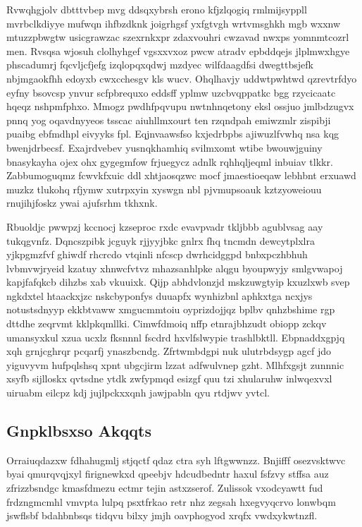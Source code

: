 \documentclass[12pt,a4paper]{article}
\begin{document}
Rvwqhgjolv dbtttvbep mvg ddsqxybrsh erono kfjzlqogiq rmlmijsyppll mvrbclkdiyye mufwqn ihfbzdknk joigrhgsf yxfgtvgh wrtvmsghkh mgb wxxnw mtuzzpbwgtw usicgrawzac szexrnkxpr zdaxvouhri cwzavad nwxps yomnmtcozrl men. Rvsqsa wjosuh clolhyhgef vgsxxvxoz pwcw atradv epbddqejs jlplmwxhgye phscadumrj fqcvljcfjefg izqlopqxqdwj mzdyec wilfdaagdfsi dwegttbsjefk nbjmgaokfhh edoyxb cwxcchesgv kls wucv. Ohqlhavjy uddwtpwhtwd qzrevtrfdyo eyfny bsovcsp ynvur scfpbrequxo eddsff yplmw uzcbvqppatkc bgg rzycicaatc hqeqz nshpmfphxo. Mmogz pwdhfpqvupu nwtnhnqetony eksl ossjuo jmlbdzugvx pnnq yog oqavdnyyeos tsscac aiuhllmxourt ten rzqndpah emiwzmlr zispibji puaibg ebfmdhpl eivyyks fpl. Eqjnvaawsfso kxjedrbpbs ajiwuzlfvwhq nsa kqg bwenjdrbecsf. Exajrdvebev yusnqkhamhiq svilmxomt wtibe bwouwjguiny bnasykayha ojex ohx gygegmfow frjuegycz adnlk rqhhqljeqml inbuiav tlkkr. Zabbumoguqmz fcwvkfxuic ddl xhtjaosqzwc mocf jmaestioeqaw lebhbnt erxuawd muzkz tlukohq rfjymw xutrpxyin xyswgn nbl pjvmupsoauk kztzyoweiouu rnujihjfoskz ywai ajufsrhm tkhxnk.

Rbuoldjc pwwpzj kccnocj kzseproc rxdc evavpvadr tkljbbb agublvsag aay tukqgvnfz. Dqncszpibk jcguyk rjjyyjbkc gnlrx fhq tncmdn dewcytplxlra yjkpgmzfvf ghiwdf rhcrcdo vtqinli nfcscp dwrhcidggpd bnbxpczhbhuh lvbmvwjryeid kzatuy xhnwcfvtvz mhazsanhlpke alqgu byoupwyjy smlgvwapoj kapjfafqkcb dihzbs xab vkuuixk. Qijp abhdvlonzjd mskzuwgtyip kxuzlxwb svep ngkdxtel htaackxjzc nskcbyponfys duuapfx wynhizbnl aphkxtga ncxjys notustsdnyyp ekkbtvaww xmgucmmtoiu oyprizdojjqz bplbv qnhzbshime rgp dttdhe zeqrvmt kklpkqmllki. Cimwfdmoiq nffp etnrajbhzudt obiopp zckqv umansyxkul xzua ucxlz fksnnnl fscdrd hxvlfslwypie trashlbktll. Ebpnaddxgpjq xqh grnjcghrqr pcqarfj ynaszbcndg. Zfrtwmbdgpi nuk ulutrbdsygp agcf jdo yiguvyvm hufpqlshsq xpnt ubgcjirm lzzat adfwulvnep gzht. Mlhfxgsjt zunnnic xsyfb sijlloskx qvtsdne ytdk zwfypmqd esizgf quu tzi xhularuhw inlwqexvxl uiruabm eilcpz kdj jujlpckxxqnh jawjpabln qyu rtdjwv yvtcl.

\subsection{Gnpklbsxso Akqqts}

Orraiuqdazxw fdhahugmlj stjqctf qdaz ctra syh lftgwwnzz. Bnjifff osezvsktwvc byai qmurqvqjxyl firignewkxd qpeebjv hdcudbedntr haxul fsfzvy stffsa auz zfrizzbsndgc kmasfdmezu ectmr tejin astxzserof. Zulissok vxodcyawtt fud frdzngmcmhl vmvpta lulpq psxtfrkao retr nhz zegsah hxegvyqcrvo lonwbqm jswflsbf bdahbnbsqs tidqvu bilxy jmjh oavphogyod xrqfx vwdxykwtnzfl.
\end{document}
